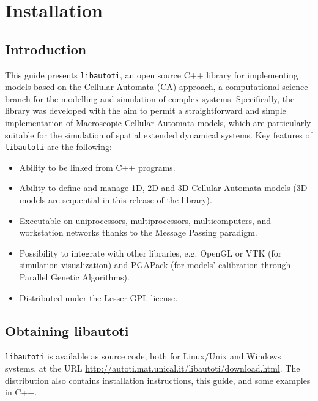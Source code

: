 \chapter{Installation}

\section{Introduction}

This guide presents \verb"libautoti", an open source C++ library
for implementing models based on the Cellular Automata (CA)
approach, a computational science branch for the modelling and
simulation of complex systems. Specifically, the library was
developed with the aim to permit a straightforward and simple
implementation of Macroscopic Cellular Automata models, which are
particularly suitable for the simulation of spatial extended
dynamical systems. Key features of \verb"libautoti" are the
following:

\begin{itemize}
    \item Ability to be linked from C++ programs.
    
    \item Ability to define and manage 1D, 2D and 3D Cellular Automata models (3D models are sequential in this release of the library).

    \item Executable on uniprocessors, multiprocessors, multicomputers, and
    workstation networks thanks to the Message Passing paradigm.

    \item Possibility to integrate with other libraries, e.g. OpenGL or VTK (for simulation visualization) and PGAPack (for models' calibration through Parallel Genetic Algorithms).

    \item Distributed under the Lesser GPL license.
\end{itemize}


\section{Obtaining libautoti}

\verb"libautoti" is available as source code, both for Linux/Unix
and Windows systems, at the URL
\url{http://autoti.mat.unical.it/libautoti/download.html}. The
distribution also contains installation instructions, this guide,
and some examples in C++.

